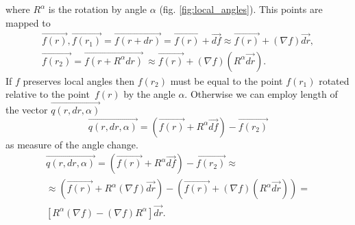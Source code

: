 \documentclass{article}
\newcommand{\vect}{\overrightarrow}
\begin{document}
where $R^\alpha$ is the rotation by angle $\alpha$ (fig. \ref{fig:local_angles}). This points are mapped to 
\begin{multline*}
  \vect{f(r)}, 
  \vect{f(r_1)} = \vect{f(r + dr)} = \vect{f(r)} + \vect{df} \approx \vect{f(r)} + (\nabla f) \vect{dr}, \\
  \vect{f(r_2)} = \vect{f(r + R^\alpha dr)} ~\approx \vect{f(r)} + (\nabla f)(R^\alpha \vect{dr}).
\end{multline*}
If $f$ preserves local angles then $f(r_2)$ must be equal to the point $f(r_1)$ rotated relative to the point~$f(r)$ by the angle $\alpha$. 
Otherwise we can employ length of the vector $\vect{q(r, dr, \alpha)}$
$$\vect{q(r, dr, \alpha)} = \left(\vect{f(r)} + R^\alpha \vect{df}\right) - \vect{f(r_2)}$$ as measure of the angle change.
\begin{multline}
\label{formula:angle_change_vec}
  \vect{q(r, dr, \alpha)} = \left(\vect{f(r)} + R^\alpha \vect{df} \right) - \vect{f(r_2)} \approx \\
  \approx (\vect{f(r)} + R^\alpha (\nabla f) \vect{dr}) - (\vect{f(r)} + (\nabla f)(R^\alpha \vect{dr})) = \\ 
  \left[R^\alpha (\nabla f) - (\nabla f) R^\alpha \right] \vect{dr}. 
\end{multline}
\end{document}
